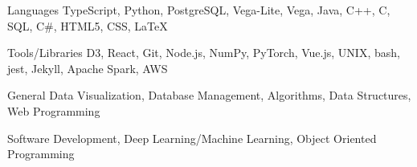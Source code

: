 

\begin{cvskills}

  \cvskill
    {Languages} %
    {TypeScript, Python, PostgreSQL, Vega-Lite, Vega, Java, C++, C, SQL, C\#, HTML5, CSS, LaTeX} %

  \cvskill
    {Tools/Libraries} %
    {D3, React, Git, Node.js, NumPy, PyTorch, Vue.js, UNIX, bash, jest, Jekyll, Apache Spark, AWS} %

  \cvskill
    {General} %
    {Data Visualization, Database Management, Algorithms, Data Structures, Web Programming} %

  \cvskill
    {} %
    {Software Development, Deep Learning/Machine Learning, Object Oriented Programming} %

\end{cvskills}